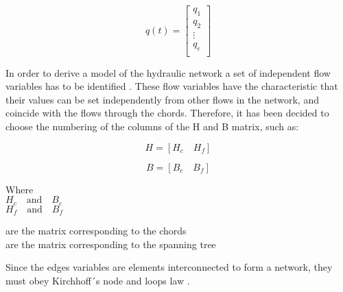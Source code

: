 \begin{minipage}{0.45\linewidth}
 \begin{equation}
q(t) =
\begin{bmatrix}
         q_1 \\
	q_2 \\ 
	\vdots \\
	q_e \\
\end{bmatrix}
\end{equation}
\end{minipage}
 
In order to derive a model of the hydraulic network a set of independent flow variables has to be identified \cite{TowerModel}. These flow variables have the characteristic 
that their values can be set independently from other flows in the network, and coincide with the flows through the chords. 
Therefore, it has been decided to choose the numbering of the columns of the 
H and B matrix, such as:

\begin{minipage}{0.45\textwidth}
\begin{equation}
H = [H_c \quad H_f]
\end{equation}   \nonumber
\end{minipage}

\begin{minipage}{0.45\textwidth}
\begin{equation}
B = [B_c  \quad B_f]
\end{equation}
\end{minipage}

\begin{minipage}[t]{0.20\textwidth}
Where\\
\hspace*{8mm} $H_c \quad \text{and} \quad B_c$ \\
\hspace*{8mm} $H_f \quad \text{and} \quad B_f$ 
\end{minipage}
\begin{minipage}[t]{0.68\textwidth}
\vspace*{2mm}
\hspace*{8mm} are the matrix corresponding to the chords\\
\hspace*{8mm} are the matrix corresponding to the spanning tree 
\end{minipage}

Since the edges variables are elements interconnected to form a network, 
they must obey Kirchhoff´s node and loops law \cite{GraphModel}. 

